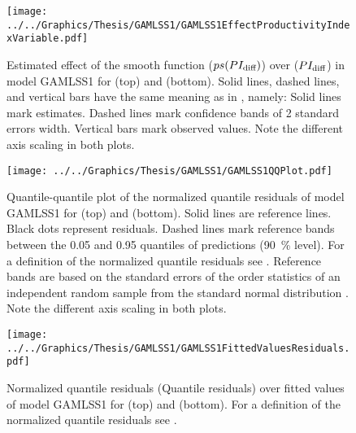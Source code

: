 \begin{figure}[h]
  \centering
  \texttt{[image: ../../Graphics/Thesis/GAMLSS1/GAMLSS1EffectProductivityIndexVariable.pdf]}
  \caption{Estimated effect of the \ProductivityIndexVariableText{} smooth function (\(ps(PI_{\text{diff}}{})\)) over \ProductivityIndexVariableText{} (\(PI_{\text{diff}}{}\)) in model GAMLSS1 for \Beech{} (top) and \Spruce{} (bottom).  Solid lines, dashed lines, and vertical bars have the same meaning as in , namely:  Solid lines mark estimates.  Dashed lines mark confidence bands of 2 standard errors width.  Vertical bars mark observed values.  Note the different axis scaling in both plots.}
  \label{fig:GAMLSS1EffectProductivityIndexVariable}
\end{figure}

\begin{figure}[h]
  \centering
  \texttt{[image: ../../Graphics/Thesis/GAMLSS1/GAMLSS1QQPlot.pdf]}
  \caption{Quantile-quantile plot of the normalized quantile residuals of model GAMLSS1 for \Beech{} (top) and \Spruce{} (bottom).  Solid lines are reference lines.  Black dots represent residuals.  Dashed lines mark reference bands between the \num{0.05} and \num{0.95} quantiles of predictions (\SI{90}{\percent} level).  For a definition of the normalized quantile residuals see \textcite{Dunn1996}.  Reference bands are based on the standard errors of the order statistics of an independent random sample from the standard normal distribution \parencite{Fox2016}.  Note the different axis scaling in both plots.}
  \label{fig:GAMLSS1QQPlot}
\end{figure}

\begin{figure}[h]
  \centering
  \texttt{[image: ../../Graphics/Thesis/GAMLSS1/GAMLSS1FittedValuesResiduals.pdf]}
  \caption{Normalized quantile residuals (Quantile residuals) over fitted values of model GAMLSS1 for \Beech{} (top) and \Spruce{} (bottom).  For a definition of the normalized quantile residuals see \textcite{Dunn1996}.}
  \label{fig:GAMLSS1FittedValuesResiduals}
\end{figure}

